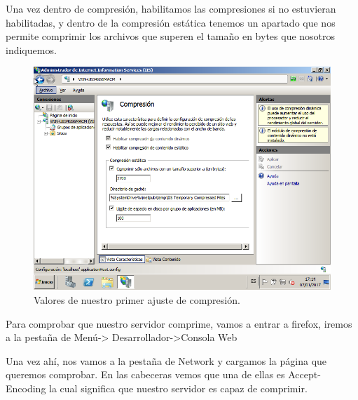 Una vez dentro de compresión, habilitamos las compresiones si no estuvieran habilitadas, y dentro de la compresión estática tenemos un apartado que nos permite comprimir los archivos que superen el tamaño en bytes que nosotros indiquemos.

\begin{figure}[H] %
	\centering
	\includegraphics[scale=0.5]{imagenes/Compresion2.png}  %
	\caption{Valores de nuestro primer ajuste de compresión.} \label{fig:figura15}
\end{figure}


Para comprobar que nuestro servidor comprime, vamos a entrar a firefox, iremos a la pestaña de Menú-> Desarrollador->Consola Web

Una vez ahí, nos vamos a la pestaña de Network y cargamos la página que queremos comprobar.
En las cabeceras vemos que una de ellas es Accept-Encoding la cual significa que nuestro servidor es capaz de comprimir. \cite{mozilla}

